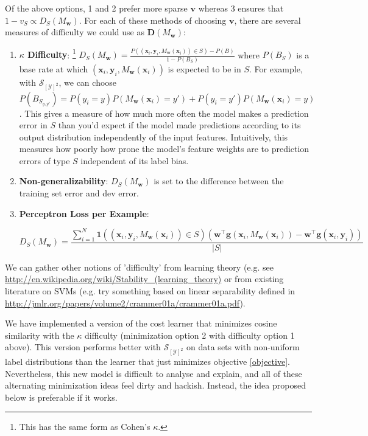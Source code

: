 \documentclass[11pt,letterpaper]{article}
\begin{document}
Of the above options, 1 and 2 prefer more sparse $\mathbf{v}$ whereas 3 
ensures that $1-v_S\propto D_S(M_\mathbf{w})$.  For each of these 
methods of choosing $\mathbf{v}$, there are several 
measures of difficulty we could use as $\mathbf{D}(M_\mathbf{w})$:

\begin{enumerate}

\item \textbf{$\kappa$ Difficulty}:
\footnote{This has the same form as Cohen's $\kappa$.}  
$D_S(M_\mathbf{w})=\frac{
P((\mathbf{x}_i,\mathbf{y}_i,M_{\mathbf{w}}(\mathbf{x}_i))\in S)-P(B)}{1-P(B_S)}$ 
where $P(B_S)$ 
is a base rate at which 
$(\mathbf{x}_i,\mathbf{y}_i,M_{\mathbf{w}}(\mathbf{x}_i))$ 
is expected
to be in $S$.  For example, with $\mathcal{S}_{[\mathcal{Y}]^2}$, we can 
choose
$P(B_{S_{y,y'}})=P(y_i=y)P(M_{\mathbf{w}}(\mathbf{x}_i)=y')+P(y_i=y')P(M_{\mathbf{w}}(\mathbf{x}_i)=y)$.  
This gives a measure of how much more often the model makes a prediction
error in $S$ than you'd expect if the model made predictions according to its 
output distribution independently of the input features.  Intuitively, this 
measures how poorly how prone the model's feature weights are to prediction 
errors of type $S$ independent of its label bias.

\item \textbf{Non-generalizability}: $D_S(M_\mathbf{w})$ is set to the 
difference between the training set error and dev error.

\item \textbf{Perceptron Loss per Example}: 

\begin{equation*}
D_S(M_\mathbf{w})=\frac{\sum_{i=1}^N\mathbf{1}((\mathbf{x}_i,\mathbf{y}_i,M_\mathbf{w}(\mathbf{x}_i))\in S)(\mathbf{w}^\top\mathbf{g}(\mathbf{x}_i,M_{\mathbf{w}}(\mathbf{x}_i))-\mathbf{w}^\top\mathbf{g}(\mathbf{x}_i,\mathbf{y}_i))}{|S|}
\end{equation*}

\end{enumerate}

We can gather other notions of 'difficulty' from learning theory (e.g. see 
\url{http://en.wikipedia.org/wiki/Stability_(learning_theory)} or from 
existing literature on SVMs (e.g. try something based on linear separability 
defined in \url{http://jmlr.org/papers/volume2/crammer01a/crammer01a.pdf}).

We have implemented a version of the cost learner that minimizes cosine 
similarity with the $\kappa$ 
difficulty (minimization option 2 with difficulty option 1 above).  This 
version performs better with $\mathcal{S}_{[\mathcal{Y}]^2}$ on data sets 
with non-uniform label distributions than the
learner that just minimizes objective \ref{objective}.  Nevertheless, this 
new model is 
difficult to analyse and explain, and all of these alternating 
minimization ideas feel dirty and hackish.  Instead, the idea proposed below 
is preferable if it works.
\end{document}
